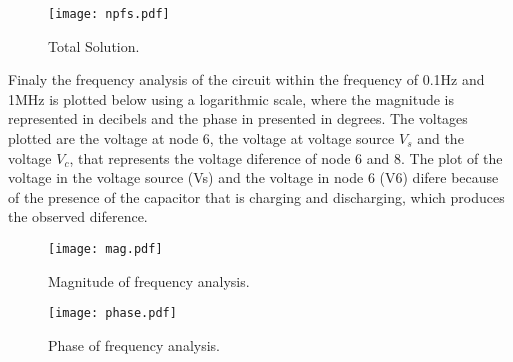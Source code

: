 \begin{figure}[ht] \centering
\texttt{[image: npfs.pdf]}
\caption{Total Solution.}
\label{Fig1: npfs}
\end{figure}

Finaly the frequency analysis of the circuit within the frequency of 0.1Hz and 1MHz is plotted below using a logarithmic scale, where the magnitude is represented in decibels and the phase in presented in degrees. The voltages plotted are the voltage at node 6, the voltage at voltage source $V_s$ and the voltage $V_c$, that represents the voltage diference of node 6 and 8. The plot of the voltage in the voltage source (Vs) and the voltage in node 6 (V6) difere because of the presence of the capacitor that is charging and discharging, which produces the observed diference.

\begin{figure}[ht] \centering
\texttt{[image: mag.pdf]}
\caption{Magnitude of frequency analysis.}
\label{Fig1: mag}
\end{figure}

\begin{figure}[ht] \centering
\texttt{[image: phase.pdf]}
\caption{Phase of frequency analysis.}
\label{Fig1: phase}
\end{figure}
